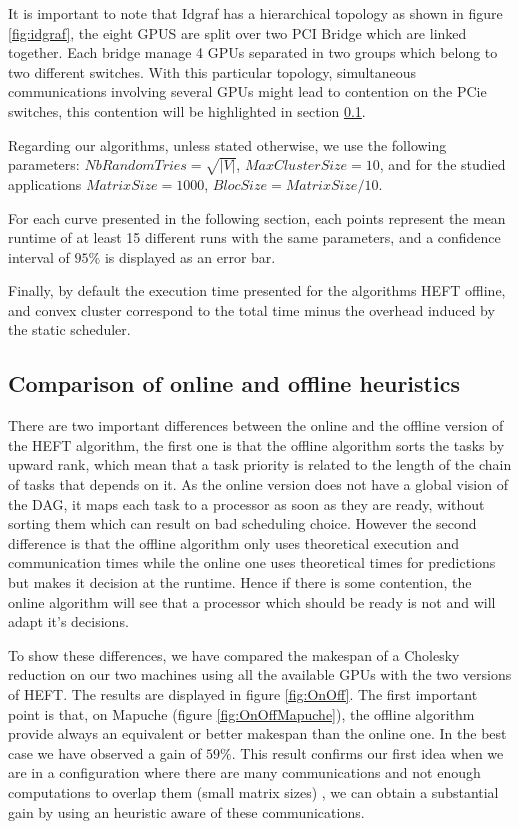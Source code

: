 \documentclass[10pt, conference, compsocconf,pdftex,dvipsnames]{IEEEtran}
\newcommand{\mytodo}[1]{\todo[inline]{#1}}
\begin{document}
It is important to note that Idgraf has a hierarchical topology as shown in
figure \ref{fig:idgraf}, the eight GPUS are split over two PCI Bridge which
are linked together. Each bridge manage 4 GPUs separated in two groups which
belong to two different switches. With this particular topology, simultaneous
communications involving several GPUs might lead to contention on the PCie
switches, this contention will be highlighted in section
\ref{sec:exp-exp-perf}.

Regarding our algorithms, unless stated otherwise, we use the following
parameters: $NbRandomTries=\sqrt{|V|}$, $MaxClusterSize=10$, and for the
studied applications $MatrixSize=1000$, $BlocSize=MatrixSize/10$.

For each curve presented in the following section, each points represent the
mean runtime of at least 15 different runs with the same parameters, and a
confidence interval of $95\%$ is displayed as an error bar.

Finally, by default the execution time presented for the algorithms HEFT
offline, and convex cluster correspond to the total time minus the overhead
induced by the static scheduler.

\subsection{Comparison of online and offline heuristics}
\label{sec:exp-exp-perf}
\mytodo{Continue re read here}

There are two important differences between the online and the offline version
of the HEFT algorithm, the first one is that the offline algorithm sorts the
tasks by upward rank, which mean that a task priority is related to the length
of the chain of tasks that depends on it. As the online version does not have
a global vision of the DAG, it maps each task to a processor as soon as they
are ready, without sorting them which can result on bad scheduling choice.
However the second difference is that the offline algorithm only uses
theoretical execution and communication times while the online one uses
theoretical times for predictions but makes it decision at the runtime. Hence
if there is some
contention, the online algorithm will see that a processor which should be
ready is not and will adapt it's decisions.

To show these differences, we have compared the makespan of a Cholesky
reduction on our two machines using all the available GPUs  with the two
versions of HEFT. The results are displayed in figure \ref{fig:OnOff}. The
first important point is that, on Mapuche (figure \ref{fig:OnOffMapuche}), the
offline algorithm provide always an equivalent or better makespan than the
online one. In the best case we have observed a gain of $59\%$. This result
confirms our first idea when we are in a configuration where there are many
communications and not enough computations to overlap them (small matrix
sizes) , we can obtain a substantial gain by using an heuristic aware of these
communications. 
\end{document}
